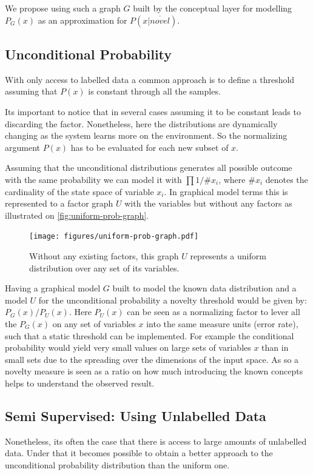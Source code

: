\documentclass[runningheads,a4paper]{llncs}
\begin{document}
We propose using such a graph $G$ built by the conceptual layer for modelling $P_G(x)$
as an approximation for $P(x|\overline{novel})$.

\subsection{Unconditional Probability}
\label{sec:unconditional-prob}
With only access to labelled data a common approach is to define a threshold assuming
that $P(x)$ is constant through all the samples.

Its important to notice that in several cases assuming it to be constant leads to
discarding the factor.
Nonetheless, here the distributions are dynamically changing as the system learns
more on the environment.
So the normalizing argument $P(x)$ has to be evaluated for each new subset of $x$.

Assuming that the unconditional distributions generates all possible outcome with
the same probability we can model it with $\prod{1/\# x_i}$,
where $\# x_i$ denotes the cardinality of the state space of variable $x_i$.
In graphical model terms this is represented to a factor graph $U$ with the
variables but without any factors as illustrated on \autoref{fig:uniform-prob-graph}.

\begin{figure}
\centering
\texttt{[image: figures/uniform-prob-graph.pdf]}
\caption{\label{fig:uniform-prob-graph}Without any existing factors, this graph $U$ represents a
         uniform distribution over any set of its variables.}
\end{figure}

Having a graphical model $G$ built to model the known data distribution and a model
$U$ for the unconditional probability a novelty threshold would be given by:
$P_G(x)/P_U(x)$.
Here $P_{U}(x)$ can be seen as a normalizing factor to lever all the $P_G(x)$ on any set of
variables $x$ into the same measure units (error rate), such that a static threshold can be implemented.
For example the conditional probability would yield very small values on large sets of variables
$x$ than in small sets due to the spreading over the dimensions of the input space.
As so a novelty measure is seen as a ratio on how much introducing the known concepts helps to
understand the observed result.


\subsection{Semi Supervised: Using Unlabelled Data}
Nonetheless, its often the case that there is access to large amounts of unlabelled data.
Under that it becomes possible to obtain a better approach to the unconditional probability
distribution than the uniform one.
\end{document}
